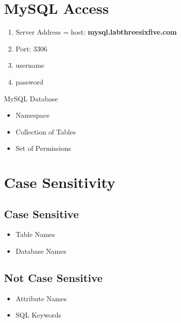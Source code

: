 \documentclass[twoside]{article}
\begin{document}
\section*{MySQL Access}
\begin{enumerate}
    \item Server Address = host: \textbf{mysql.labthreesixfive.com}
    \item Port: 3306
    \item username
    \item password
\end{enumerate}

MySQL Database
\begin{itemize}
    \item Namespace
    \item Collection of Tables
    \item Set of Permissions
\end{itemize}

\section*{Case Sensitivity}
\subsection*{Case Sensitive}
\begin{itemize}
    \item Table Names
    \item Database Names
\end{itemize}
\subsection*{Not Case Sensitive}
\begin{itemize}
    \item Attribute Names
    \item SQL Keywords
\end{itemize}
\end{document}
